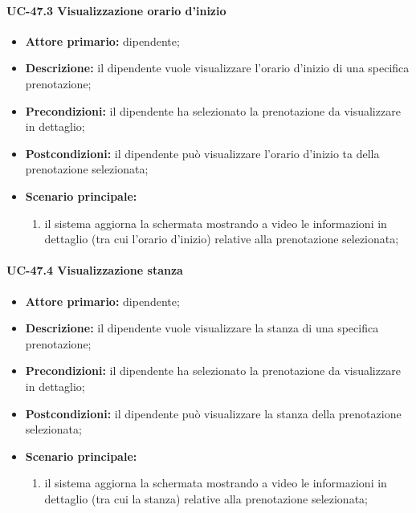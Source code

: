 \paragraph{UC-47.3 Visualizzazione orario d'inizio}

    \begin{itemize}
        \item \textbf{Attore primario:} dipendente;

        \item \textbf{Descrizione:} il dipendente vuole visualizzare l'orario d'inizio di una specifica prenotazione;

        \item \textbf{Precondizioni:} il dipendente ha selezionato la prenotazione da visualizzare in dettaglio;

        \item \textbf{Postcondizioni:} il dipendente può visualizzare l'orario d'inizio ta della prenotazione selezionata;

        \item \textbf{Scenario principale:}
            \begin{enumerate}
                 \item il sistema aggiorna la schermata mostrando a video le informazioni in dettaglio (tra cui l'orario d'inizio) relative alla prenotazione selezionata;
            \end{enumerate}
    \end{itemize} 

\paragraph{UC-47.4 Visualizzazione stanza}

    \begin{itemize}
        \item \textbf{Attore primario:} dipendente;

        \item \textbf{Descrizione:} il dipendente vuole visualizzare la stanza di una specifica prenotazione;

        \item \textbf{Precondizioni:} il dipendente ha selezionato la prenotazione da visualizzare in dettaglio;

        \item \textbf{Postcondizioni:} il dipendente può visualizzare la stanza della prenotazione selezionata;

        \item \textbf{Scenario principale:}
            \begin{enumerate}
                 \item il sistema aggiorna la schermata mostrando a video le informazioni in dettaglio (tra cui la stanza) relative alla prenotazione selezionata;
            \end{enumerate}
    \end{itemize} 

